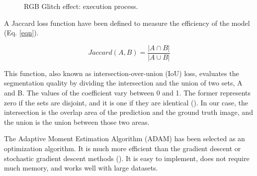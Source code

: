 \documentclass[english]{sbrt}
\begin{document}
\begin{figure}[hbt]
\centering 
{}
\caption{\label{fig:graph3} RGB Glitch effect: execution process.}
\end{figure}

A Jaccard loss function have been defined to measure the efficiency of the model (Eq. \ref{eqn}). 

\begin{equation} 
\label{eqn}
Jaccard(A,B) = \frac{|A\cap B|}{|A\cup B|}
\end{equation}

This function, also known as intersection-over-union (IoU) loss, evaluates the segmentation quality by dividing the intersection and the union of two sets, A and B. The values of the coefficient vary between 0 and 1. The former represents zero if the sets are disjoint, and it is one if they are identical (\cite{duquearias_2021_on}). In our case, the intersection is the overlap area of the prediction and the ground truth image, and the union is the union between those two areas.

The Adaptive Moment Estimation Algorithm (ADAM) has been selected as an optimization algorithm. It is much more efficient than the gradient descent or stochastic gradient descent methods (\cite{battini_2018_adam}). It is easy to implement, does not require much memory, and works well with large datasets.
\end{document}
